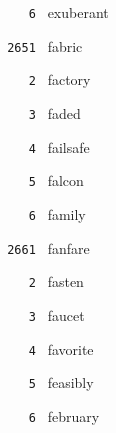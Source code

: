 \documentclass[11pt]{article}
\begin{document}
\begin{multicols}{6}
\noindent \texttt{ \ \ \ 6 } exuberant  \par
\vspace{3mm}
\noindent \texttt{ 2651 } fabric  \par
\noindent \texttt{ \ \ \ 2 } factory  \par
\noindent \texttt{ \ \ \ 3 } faded  \par
\noindent \texttt{ \ \ \ 4 } failsafe  \par
\noindent \texttt{ \ \ \ 5 } falcon  \par
\noindent \texttt{ \ \ \ 6 } family  \par
\vspace{3mm}
\noindent \texttt{ 2661 } fanfare  \par
\noindent \texttt{ \ \ \ 2 } fasten  \par
\noindent \texttt{ \ \ \ 3 } faucet  \par
\noindent \texttt{ \ \ \ 4 } favorite  \par
\noindent \texttt{ \ \ \ 5 } feasibly  \par
\noindent \texttt{ \ \ \ 6 } february  \par
\end{multicols}
\end{document}

